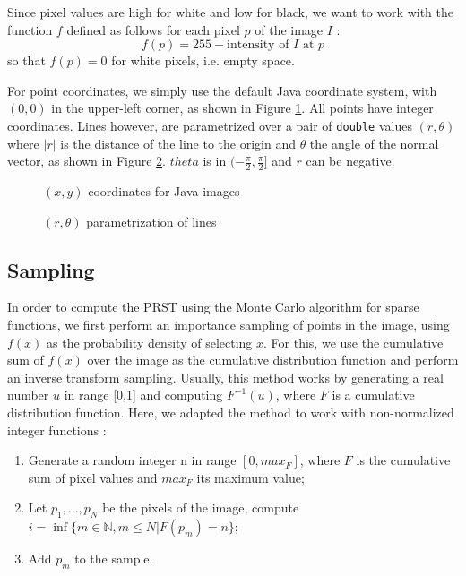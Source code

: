 \documentclass[10pt,a4paper]{article}			%
\begin{document}
Since pixel values are high for white and low for black, we want to work with the function $f$ defined as follows for each pixel $p$ of the image $I$ :
\[f(p) = 255 - \text{intensity of $I$ at $p$}\]
so that $f(p)=0$ for white pixels, i.e. empty space.

For point coordinates, we simply use the default Java coordinate system, with $(0,0)$ in the upper-left corner, as shown in Figure \ref{coordinates}. All points have integer coordinates. Lines however, are parametrized over a pair of \texttt{double} values $(r,\theta)$ where $|r|$ is the distance of the line to the origin and $\theta$ the angle of the normal vector, as shown in Figure \ref{lines_parametrization}. $theta$ is in $(-\frac{\pi}{2},\frac{\pi}{2}]$ and $r$ can be negative.\\

\begin{figure}[h]

\caption{$(x,y)$ coordinates for Java images}
\label{coordinates}	
\end{figure}

\begin{figure}[h]	
	
\caption{$(r,\theta)$ parametrization of lines}
\label{lines_parametrization}
\end{figure}

	\subsection{Sampling}
In order to compute the PRST using the Monte Carlo algorithm for sparse functions, we first perform an importance sampling of points in the image, using $f(x)$  as the probability density of selecting $x$. For this, we use the cumulative sum of $f(x)$ over the image as the cumulative distribution function and perform an inverse transform sampling. Usually, this method works by generating a real number $u$ in range [0,1] and computing $F^{-1}(u)$, where $F$ is a cumulative distribution function. Here, we adapted the method to work with non-normalized integer functions :
\begin{enumerate}
\item Generate a random integer n in range $[0,max_F]$, where $F$ is the cumulative sum of pixel values and $max_F$ its maximum value;
\item Let $p_1,...,p_N$ be the pixels of the image, compute $i=\inf\{m\in \mathbb{N}, m\leq N |  F(p_m) = n\}$;
\item Add $p_m$ to the sample.
\end{enumerate}
\end{document}
